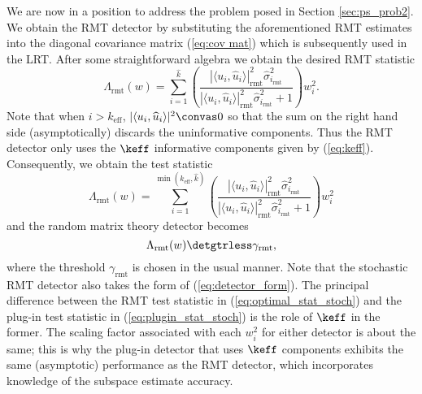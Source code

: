 We are now in a position to address the problem posed in Section \ref{sec:ps_prob2}. We obtain the RMT detector by substituting the aforementioned RMT estimates into the diagonal covariance matrix (\ref{eq:cov mat}) which is subsequently used in the LRT. After some straightforward algebra we obtain the desired RMT statistic
\begin{equation*}
\Lambda_{\text{rmt}}(w)= \sum_{i=1}^{\widehat{k}}\left(\frac{|\langle u_i,\widehat{u}_i\rangle|^2_{\text{rmt}}\widehat{\sigma}_{i_\text{rmt}}^2}{|\langle u_i,\widehat{u}_i\rangle|^2_{\text{rmt}}\widehat{\sigma}_{i_\text{rmt}}^2 + 1}\right)w_i^2.
\end{equation*}
Note that when $i>k_\text{eff}$, $|\langle u_i,\widehat{u}_i\rangle|^2 \convas 0$ so that the sum on the right hand side (asymptotically) discards the uninformative components. Thus the RMT detector only uses the $\keff$ informative components given by (\ref{eq:keff}). Consequently, we obtain the test statistic
\begin{equation}\label{eq:optimal_stat_stoch}
\boxed{\Lambda_{\text{rmt}}(w)= \sum_{i=1}^{\min(k_\text{eff},\widehat{k})}\left(\frac{|\langle u_i,\widehat{u}_i\rangle|^2_{\text{rmt}}\widehat{\sigma}_{i_\text{rmt}}^2}{|\langle u_i,\widehat{u}_i\rangle|^2_{\text{rmt}}\widehat{\sigma}_{i_\text{rmt}}^2 + 1}\right)w_i^2}
\end{equation}
and the random matrix theory detector becomes
\begin{equation}\label{eq:optimal_class_stoch}
{\Lambda_{\text{rmt}}(w) \detgtrless \gamma_{\text{rmt}}},
\end{equation}
where the threshold $\gamma_{\text{rmt}}$ is chosen in the usual manner. Note that the stochastic RMT detector also takes the form of (\ref{eq:detector_form}). The principal difference between the RMT test statistic in (\ref{eq:optimal_stat_stoch}) and the plug-in test statistic in (\ref{eq:plugin_stat_stoch}) is the role of $\keff$ in the former. The scaling factor associated with each $w_i^{2}$ for either detector is about the same; this is why the plug-in detector that uses $\keff$ components exhibits the same (asymptotic) performance as the RMT detector, which incorporates knowledge of the subspace estimate accuracy.


